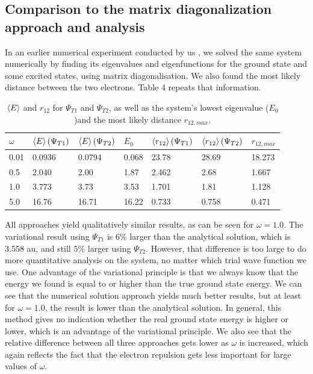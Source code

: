 \documentclass[10pt,a4paper]{article}
\begin{document}
\subsection{Comparison to the matrix diagonalization approach and analysis}
In an earlier numerical experiment conducted by us \cite{Project2}, we solved the same system numerically by finding its eigenvalues and eigenfunctions for the ground state and some excited states, using matrix diagonalisation. We also found the most likely distance between the two electrons. Table 4 repeats that information. 
\begin{table}[H]
\centering
\caption[Energies and distances compared to diagonalisation]{$\braket{E}$ and $r_{12}$ for $\Psi_{T1}$ and $\Psi_{T2}$, as well as the system's lowest eigenvalue ($E_0$)and the most likely distance $r_{12,max}$.}
\begin{tabular}{|l|l|l|l|l|l|l|}
\hline
$\omega$ & $\braket{E}(\Psi_{T1})$ & $\braket{E}(\Psi_{T2})$ & $E_0$ & $\braket{r_{12}}(\Psi_{T1})$ & $\braket{r_{12}}(\Psi_{T2})$ & $r_{12,max}$ \\ \hline
0.01     & 0.0936                 & 0.0794                  & 0.068 & 23.78                        & 28.69                        & 18.273    \\ \hline
0.5      & 2.040                  & 2.00                    & 1.87  & 2.462                        & 2.68                         & 1.667     \\ \hline
1.0      & 3.773                  & 3.73                    & 3.53  & 1.701                        & 1.81                         & 1.128     \\ \hline
5.0      & 16.76                  & 16.71                   & 16.22 & 0.733                        & 0.758                        & 0.471     \\ \hline
\end{tabular}
\end{table}
All approaches yield qualitatively similar results, as can be seen for $\omega=1.0$. The variational result using $\Psi_{T1}$ is 6\% larger than the analytical solution, which is 3.558 au, and still 5\% larger using $\Psi_{T2}$. However, that difference is too large to do more quantitative analysis on the system, no matter which trial wave function we use.  One advantage of the variational principle is that we always know that the energy we found is equal to or higher than the true ground state energy. We can see that the numerical solution approach yields much better results, but at least for $\omega=1.0$, the result is lower than the analytical solution. In general, this method gives no indication whether the real ground state energy is higher or lower, which is an advantage of the variational principle. We also see that the relative difference between all three approaches gets lower as $\omega$ is increased, which again reflects the fact that the electron repulsion gets less important for large values of $\omega$.\\
\end{document}
